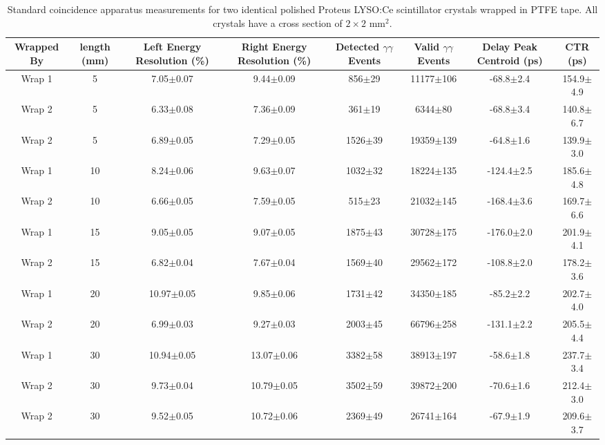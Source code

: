 \begin{table}
\caption{\label{tab:standardctr} Standard coincidence apparatus measurements for two identical polished Proteus LYSO:Ce scintillator crystals wrapped in PTFE tape. All crystals have a cross section of $2\times2$ mm$^2$.}
\begin{tabular}{cccccccc}
\hline
Wrapped By &  length (mm) & Left Energy Resolution (\%) & Right Energy Resolution (\%) & Detected $\gamma\gamma$ Events & Valid $\gamma\gamma$ Events & Delay Peak Centroid (ps) & CTR (ps)\\
\hline
    Wrap 1 &      5 &   7.05$\pm$0.07 &   9.44$\pm$0.09 &   856$\pm$29 &  11177$\pm$106 &   -68.8$\pm$2.4 &  154.9$\pm$4.9 \\
    Wrap 2 &      5 &   6.33$\pm$0.08 &   7.36$\pm$0.09 &   361$\pm$19 &    6344$\pm$80 &   -68.8$\pm$3.4 &  140.8$\pm$6.7 \\
    Wrap 2 &      5 &   6.89$\pm$0.05 &   7.29$\pm$0.05 &  1526$\pm$39 &  19359$\pm$139 &   -64.8$\pm$1.6 &  139.9$\pm$3.0 \\
    Wrap 1 &     10 &   8.24$\pm$0.06 &   9.63$\pm$0.07 &  1032$\pm$32 &  18224$\pm$135 &  -124.4$\pm$2.5 &  185.6$\pm$4.8 \\
    Wrap 2 &     10 &   6.66$\pm$0.05 &   7.59$\pm$0.05 &   515$\pm$23 &  21032$\pm$145 &  -168.4$\pm$3.6 &  169.7$\pm$6.6 \\
    Wrap 1 &     15 &   9.05$\pm$0.05 &   9.07$\pm$0.05 &  1875$\pm$43 &  30728$\pm$175 &  -176.0$\pm$2.0 &  201.9$\pm$4.1 \\
    Wrap 2 &     15 &   6.82$\pm$0.04 &   7.67$\pm$0.04 &  1569$\pm$40 &  29562$\pm$172 &  -108.8$\pm$2.0 &  178.2$\pm$3.6 \\
    Wrap 1 &     20 &  10.97$\pm$0.05 &   9.85$\pm$0.06 &  1731$\pm$42 &  34350$\pm$185 &   -85.2$\pm$2.2 &  202.7$\pm$4.0 \\
    Wrap 2 &     20 &   6.99$\pm$0.03 &   9.27$\pm$0.03 &  2003$\pm$45 &  66796$\pm$258 &  -131.1$\pm$2.2 &  205.5$\pm$4.4 \\
    Wrap 1 &     30 &  10.94$\pm$0.05 &  13.07$\pm$0.06 &  3382$\pm$58 &  38913$\pm$197 &   -58.6$\pm$1.8 &  237.7$\pm$3.4 \\
    Wrap 2 &     30 &   9.73$\pm$0.04 &  10.79$\pm$0.05 &  3502$\pm$59 &  39872$\pm$200 &   -70.6$\pm$1.6 &  212.4$\pm$3.0 \\
    Wrap 2 &     30 &   9.52$\pm$0.05 &  10.72$\pm$0.06 &  2369$\pm$49 &  26741$\pm$164 &   -67.9$\pm$1.9 &  209.6$\pm$3.7 \\
\hline
\end{tabular}
\end{table}


